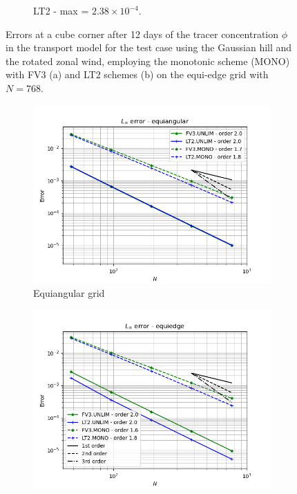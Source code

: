 \documentclass[preprint,12pt]{elsarticle}
\begin{document}
\begin{linenumbers}
\begin{figure}[!htb]
\begin{subfigure}{0.45\textwidth}
		\caption{LT2 - max = $2.38 \times 10^{-4}$.\label{GH-LT2-corner}}
	\end{subfigure}
	\caption{Errors at a cube corner after 12 days of the tracer concentration $\phi$ in the transport model for the test case using the Gaussian hill and the rotated zonal wind, employing the monotonic scheme (MONO) with FV3 (a) and LT2 schemes (b) on the equi-edge grid with $N=768$. 
	\label{GH-corner}}
\end{figure}


\begin{figure}[!htb]
	\centering
	\begin{subfigure}{0.45\textwidth}
	\centering
	\includegraphics[width=1.1\linewidth]{linferror_tc-3_alpha45.equiangular}
	\caption{Equiangular grid\label{GH-equiangular-linf}}
    \end{subfigure}
	\begin{subfigure}{0.45\textwidth}
		\centering
		\includegraphics[width=1.1\linewidth]{linferror_tc-3_alpha45.equiedge}

\end{subfigure}
\end{figure}
\end{linenumbers}
\end{document}
